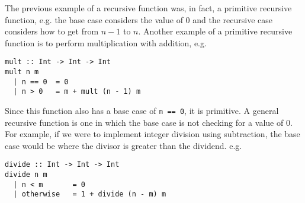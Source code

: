 The previous example of a recursive function was, in fact, a primitive recursive function, e.g. the base case considers
 the value of 0 and the recursive case considers how to get from $n - 1$ to $n$. Another example of a primitive
 recursive function is to perform multiplication with addition, e.g.
\begin{verbatim}
mult :: Int -> Int -> Int
mult n m
  | n == 0  = 0
  | n > 0   = m + mult (n - 1) m
\end{verbatim}
Since this function also has a base case of \verb`n == 0`, it is primitive. A general recursive function is one in which
 the base case is not checking for a value of 0. For example, if we were to implement integer division using
 subtraction, the base case would be where the divisor is greater than the dividend. e.g.
\begin{verbatim}
divide :: Int -> Int -> Int
divide n m
  | n < m       = 0
  | otherwise   = 1 + divide (n - m) m
\end{verbatim}